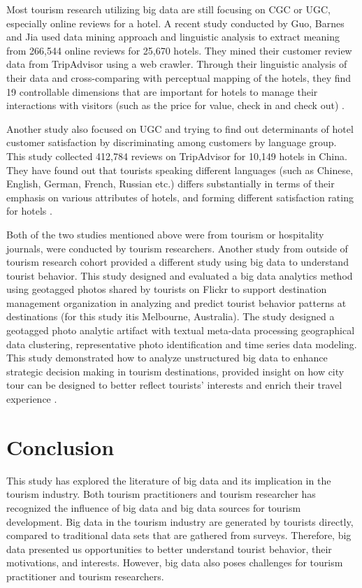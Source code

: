 \documentclass[sigconf]{acmart}
\begin{document}
Most tourism research utilizing big data are still focusing on CGC or UGC, especially
online reviews for a hotel. A recent study conducted by Guo, Barnes and Jia used data
mining approach and linguistic analysis to extract meaning from 266,544 online reviews
for 25,670 hotels. They mined their customer review data from TripAdvisor using a web
crawler. Through their linguistic analysis of their data and cross-comparing with
perceptual mapping of the hotels, they find 19 controllable dimensions that are
important for hotels to manage their interactions with visitors (such as the price for
value, check in and check out) \cite{GUO2017467}.

Another study also focused on UGC and trying to find out determinants of hotel
customer satisfaction by discriminating among customers by language group. This study
collected 412,784 reviews on TripAdvisor for 10,149 hotels in China. They have found
out that tourists speaking different languages (such as Chinese, English, German,
French, Russian etc.) differs substantially in terms of their emphasis on various
attributes of hotels, and forming different satisfaction rating for hotels
\cite{LIU2017554}.


Both of the two studies mentioned above were from tourism or hospitality journals,
were conducted by tourism researchers. Another study from outside of tourism research
cohort provided a different study using big data to understand tourist behavior. This
study designed and evaluated a big data analytics method using geotagged photos shared
by tourists on Flickr to support destination management organization in analyzing and
predict tourist behavior patterns at destinations (for this study itis Melbourne,
Australia). The study designed a geotagged photo analytic artifact with textual
meta-data processing geographical data clustering, representative photo identification
and time series data modeling. This study demonstrated how to analyze unstructured big
data to enhance strategic decision making in tourism destinations, provided insight on
how city tour can be designed to better reflect tourists' interests and enrich their
travel experience \cite{MIAH2017}. 


\section{Conclusion}
This study has explored the literature of big data and its implication in the tourism
industry. Both tourism practitioners and tourism researcher has recognized the
influence of big data and big data sources for tourism development. Big data in the
tourism industry are generated by tourists directly, compared to traditional data sets
that are gathered from surveys. Therefore, big data presented us opportunities to
better understand tourist behavior, their motivations, and interests. However, big
data also poses challenges for tourism practitioner and tourism researchers. 
\end{document}
